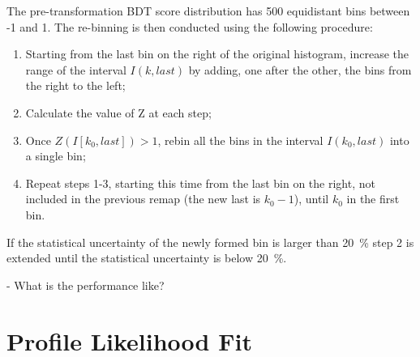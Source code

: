 The pre-transformation BDT score distribution has 500 equidistant bins between
-1 and 1. The re-binning is then conducted using the following procedure:
\begin{enumerate}
\item Starting from the last bin on the right of the original histogram,
  increase the range of the interval $I(k, last)$ by adding, one after the other,
  the bins from the right to the left;
\item Calculate the value of Z at each step;
\item Once $Z(I[k_{0}, last]) > 1$, rebin all the bins in the interval $I(k_{0},
  last)$ into a single bin;
\item Repeat steps 1-3, starting this time from the last bin on the right, not
  included in the previous remap (the new last is $k_{0}-1$), until $k_{0}$ in
  the first bin.
\end{enumerate}
If the statistical uncertainty of the newly formed bin is larger than 20~\% step
2 is extended until the statistical uncertainty is below 20~\%.

- What is the performance like?

\section{Profile Likelihood Fit}%
\label{sec:plf}

